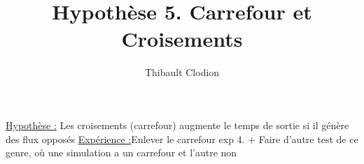 \documentclass[12pt]{article}
\title{Hypothèse 5. Carrefour et Croisements}
\author{Thibault Clodion}
\begin{document}
\maketitle %

\underline{Hypothèse :} Les croisements (carrefour) augmente le temps de sortie si il génère des flux opposés
\newline\newline
\underline{Expérience :}Enlever le carrefour exp 4. + Faire d'autre test de ce genre, où une simulation a un carrefour et l'autre non
\newline\newline
\end{document}

